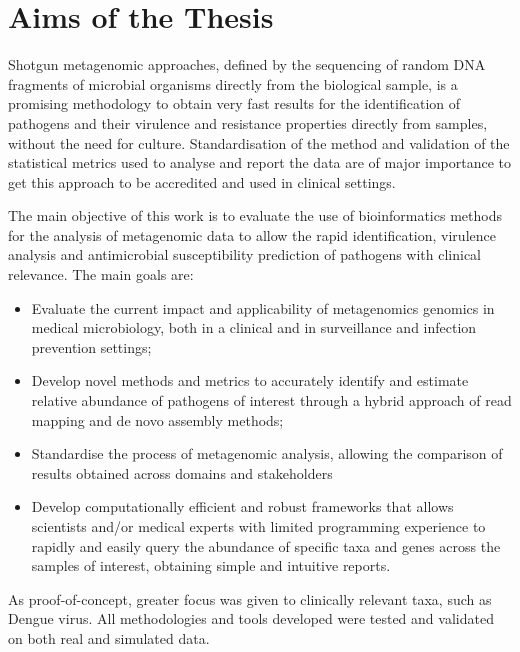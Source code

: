 \section{Aims of the Thesis}

Shotgun metagenomic approaches, defined by the sequencing of random  \ac{DNA} fragments of microbial organisms directly from the biological sample, is a promising methodology to obtain very fast results for the identification of pathogens and their virulence and resistance properties directly from samples, without the need for culture. 
Standardisation of the method and validation of the statistical metrics used to analyse and report the data are of major importance to get this approach to be accredited and used in clinical settings.

The main objective of this work is to evaluate the use of bioinformatics methods for the analysis of metagenomic data to allow the rapid identification, virulence analysis and antimicrobial susceptibility prediction of pathogens with clinical relevance. The main goals are:

\begin{itemize}
    \item Evaluate the current impact and applicability of metagenomics genomics in medical microbiology, both in a clinical and in surveillance and infection prevention settings; 
    \item Develop novel methods and metrics to accurately identify and estimate relative abundance of pathogens of interest through a hybrid approach of read mapping and de novo assembly methods;
    \item Standardise the process of metagenomic analysis, allowing the comparison of results obtained across domains and stakeholders
    \item Develop computationally efficient and robust frameworks that allows scientists and/or medical experts with limited programming experience to rapidly and easily query the abundance of specific taxa and genes across the samples of interest, obtaining simple and intuitive reports. 
\end{itemize}

As proof-of-concept, greater focus was given to clinically relevant taxa, such as Dengue virus. All methodologies and tools developed were tested and validated on both real and simulated data.
 
